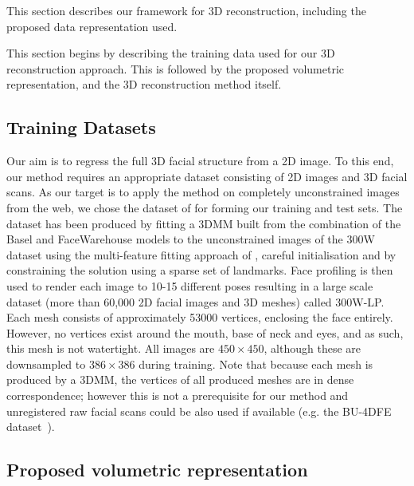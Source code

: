 This section describes our framework for 3D reconstruction, including the proposed data
representation used.

This section begins by describing the training data used for our 3D
reconstruction approach. This is followed by the proposed volumetric
representation, and the 3D reconstruction method itself.


\subsection{Training Datasets}

Our aim is to regress the full 3D facial structure from a 2D image. To
this end, our method requires an appropriate dataset consisting of 2D
images and 3D facial scans. As our target is to apply the method on
completely unconstrained images from the web, we chose the dataset of
\cite{zhu2016face} for forming our training and test sets. The dataset
has been produced by fitting a 3DMM built from the combination of the
Basel \cite{paysan20093d} and FaceWarehouse
\cite{cao2014facewarehouse} models to the unconstrained images of the
300W dataset \cite{sagonas2013semi} using the multi-feature fitting
approach of \cite{romdhani2005estimating}, careful initialisation and
by constraining the solution using a sparse set of landmarks. Face
profiling is then used to render each image to 10-15 different poses
resulting in a large scale dataset (more than 60,000 2D facial images
and 3D meshes) called 300W-LP. Each mesh consists of approximately
53000 vertices, enclosing the face entirely. However, no vertices
exist around the mouth, base of neck and eyes, and as such, this mesh
is not watertight. All images are $450 \times 450$, although these are
downsampled to $386 \times 386$ during training. Note that because
each mesh is produced by a 3DMM, the vertices of all produced meshes
are in dense correspondence; however this is not a prerequisite for
our method and unregistered raw facial scans could be also used if
available (e.g. the BU-4DFE dataset~\cite{yin2008high}).

\subsection{Proposed volumetric representation}

